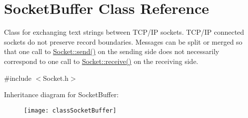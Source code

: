 \hypertarget{classSocketBuffer}{\section{Socket\-Buffer Class Reference}
\label{classSocketBuffer}
}


Class for exchanging text strings between T\-C\-P/\-I\-P sockets. T\-C\-P/\-I\-P connected sockets do not preserve record boundaries. Messages can be split or merged so that one call to \hyperlink{classSocket_a9275eacdb64056a53cf4b9cf54cd2f1a}{Socket\-::send()} on the sending side does not necessarily correspond to one call to \hyperlink{classSocket_aa5e98b6f2c4e26fcf90d71c8386fc09d}{Socket\-::receive()} on the receiving side.  




{\ttfamily \#include $<$Socket.\-h$>$}

Inheritance diagram for Socket\-Buffer\-:\begin{figure}[H]
\begin{center}
\leavevmode
\texttt{[image: classSocketBuffer]}
\end{center}
\end{figure}
